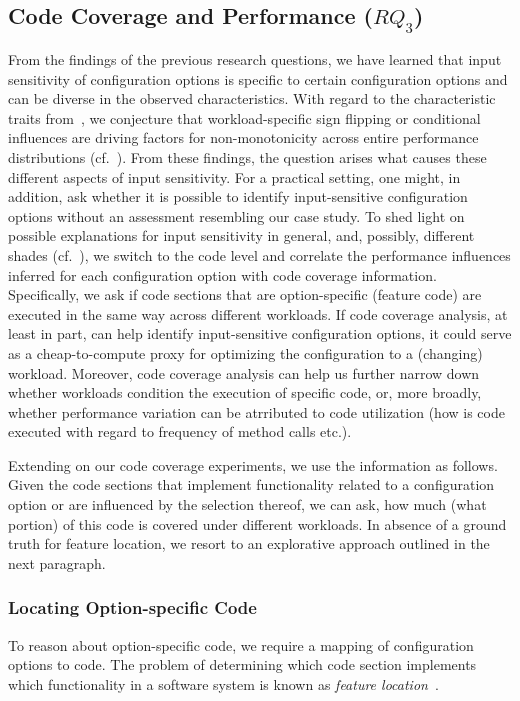 {\subsection{Code Coverage and Performance ($RQ_3$)}\label{sec:rq3}\label{sec:categories}
From the findings of the previous research questions, we have learned that input sensitivity of configuration options is specific to certain configuration options and can be diverse in the observed characteristics. With regard to the characteristic traits from~, we conjecture that workload-specific sign flipping or conditional influences are driving factors for non-monotonicity across entire performance distributions (cf.~). From these findings, the question arises what causes these different aspects of input sensitivity. For a practical setting, one might, in addition, ask whether it is possible to identify input-sensitive configuration options without an assessment resembling our case study.
To shed light on possible explanations for input sensitivity in general, and, possibly, different shades (cf.~), we switch to the code level and correlate the performance influences inferred for each configuration option with code coverage information. Specifically, we ask if code sections that are option-specific (feature code) are executed in the same way across different workloads. If code coverage analysis, at least in part, can help identify input-sensitive configuration options, it could serve as a cheap-to-compute proxy for optimizing the configuration to a (changing) workload. Moreover, code coverage analysis can help us further narrow down whether workloads condition the execution of specific code, or, more broadly, whether performance variation can be atrributed to code utilization (how is code executed with regard to frequency of method calls etc.).

Extending on our code coverage experiments, we use the information as follows. Given the code sections that implement functionality related to a configuration option or are influenced by the selection thereof, we can ask, how much (what portion) of this code is covered under different workloads. In absence of a ground truth for feature location, we resort to an explorative approach outlined in the next paragraph.

\subsubsection{Locating Option-specific Code}

To reason about option-specific code, we require a mapping of configuration options to code. 
The problem of determining which code section implements which functionality in a software system is known as \emph{feature location}~\cite{rubin_feature_2013}. 

}

